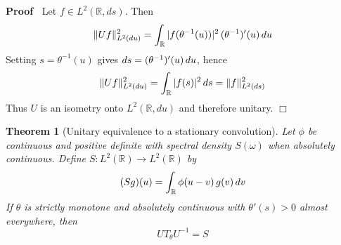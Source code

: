 \documentclass{article}
\newenvironment{proof}{\noindent\textbf{Proof\ }}{\hspace*{\fill}$\Box$\medskip}
{\theorembodyfont{\rmfamily}\newtheorem{example}{Example}}
\newtheorem{theorem}{Theorem}
\begin{document}
\begin{proof}
  Let $f \in L^2 (\mathbb{R}, ds)$. Then
  \begin{equation}
    \|Uf\|_{L^2  (du)}^2 = \int_{\mathbb{R}} |f (\theta^{- 1} (u)) |^2
    \hspace{0.17em} (\theta^{- 1})' (u)  \hspace{0.17em} du
  \end{equation}
  Setting $s = \theta^{- 1} (u)$ gives $ds = (\theta^{- 1})' (u) 
  \hspace{0.17em} du$, hence
  \begin{equation}
    \|Uf\|_{L^2  (du)}^2 = \int_{\mathbb{R}} |f (s) |^2  \hspace{0.17em} ds =
    \|f\|_{L^2  (ds)}^2
  \end{equation}
  Thus $U$ is an isometry onto $L^2 (\mathbb{R}, du)$ and therefore unitary.
\end{proof}

\begin{theorem}
  [Unitary equivalence to a stationary convolution] Let $\phi$ be continuous
  and positive definite with spectral density $S (\omega)$ when absolutely
  continuous. Define $S : L^2 (\mathbb{R}) \to L^2 (\mathbb{R})$ by
  \begin{equation}
    (Sg) (u) = \int_{\mathbb{R}} \phi (u - v)  \hspace{0.17em} g (v) 
    \hspace{0.17em} dv
  \end{equation}
  If $\theta$ is strictly monotone and absolutely continuous with $\theta' (s)
  > 0$ almost everywhere, then
  \begin{equation}
    UT_{\theta} U^{- 1} = S
  \end{equation}
\end{theorem}
\end{document}
